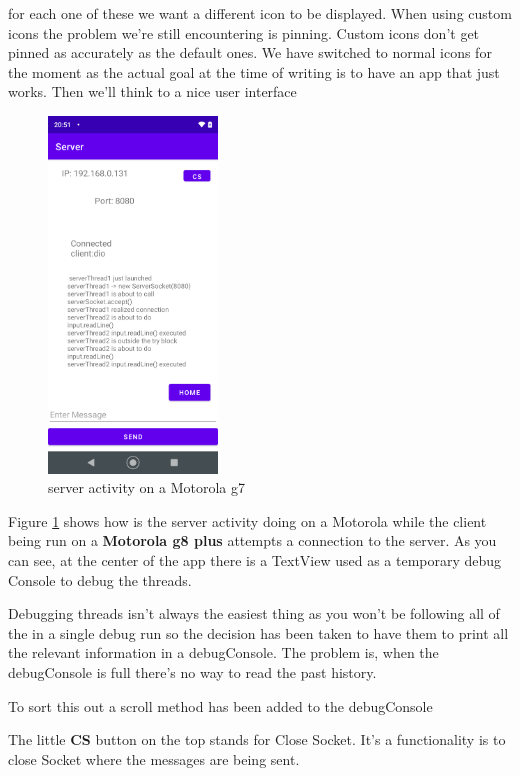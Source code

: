 \documentclass[a4paper,12pt]{book}
\begin{document}
\bigskip
for each one of these we want a different icon to be displayed. When using custom icons the problem we're still encountering is pinning. Custom icons don't get pinned as accurately as the default ones. We have switched to normal icons for the moment as the actual goal at the time of writing is to have an app that just works. Then we'll think to a nice user interface

\clearpage


\begin{figure}
\centering
\includegraphics[width=4.5cm]{./server_g7.PNG}
\caption{server activity on a Motorola g7}\label{fig:connection-attempt}
\end{figure}
Figure \ref{fig:connection-attempt} shows how is the server activity doing on a Motorola while the client\footnotemark{} being run on a \textbf{Motorola g8 plus} attempts a connection to the server. As you can see, at the center of the app there is a TextView used as a temporary debug Console to debug the threads.

Debugging threads isn't always the easiest thing as you won't be following all of the in a single debug run so the decision has been taken to have them to print all the relevant information in a debugConsole. The problem is, when the debugConsole is full there's no way to read the past history.

To sort this out a scroll method has been added to the debugConsole

The little \textbf{CS} button on the top stands for Close Socket. It's a functionality is to close Socket where the messages are being sent.
\end{document}
